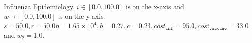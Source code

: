\begin{figure}[h!]
    \centering
    \caption{Influenza Epidemiology. $ i \in \left[ 0.0, 100.0 \right]$ is on the x-axis and $ w_1 \in \left[ 0.0, 100.0 \right]$ is on the y-axis. $ s = 50.0, r = 50.0 \eta = 1.65 \times 10^4, b = 0.27, c = 0.23, cost_{\mathtt{inf}} = 95.0, cost_{\mathtt{vaccine}} = 33.0$ and $w_2 = 1.0 $.}
    \label{fig:robot1d}
\end{figure}

